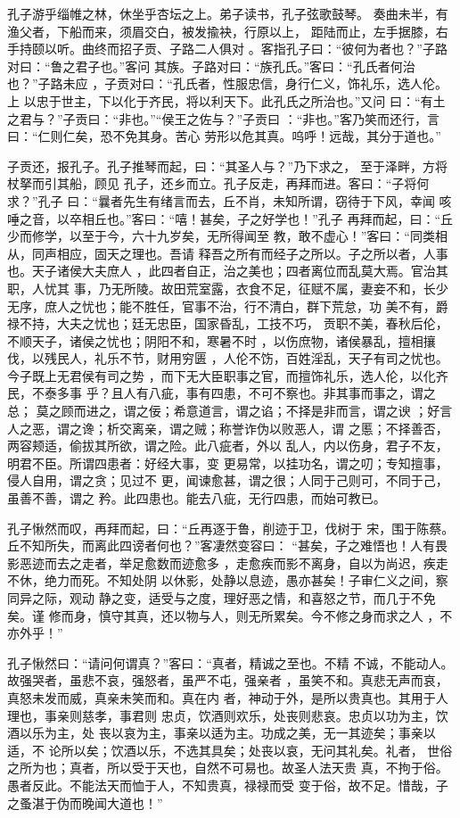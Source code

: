 \documentclass[12pt,UTF8]{ctexbook}
\begin{document}
孔子游乎缁帷之林，休坐乎杏坛之上。弟子读书，孔子弦歌鼓琴。 奏曲未半，有渔父者，下船而来，须眉交白，被发揄袂，行原以上， 距陆而止，左手据膝，右手持颐以听。曲终而招子贡、子路二人俱对 。客指孔子曰：“彼何为者也？”子路对曰：“鲁之君子也。”客问 其族。子路对曰：“族孔氏。”客曰：“孔氏者何治也？”子路未应 ，子贡对曰：“孔氏者，性服忠信，身行仁义，饰礼乐，选人伦。上 以忠于世主，下以化于齐民，将以利天下。此孔氏之所治也。”又问 曰：“有土之君与？”子贡曰：“非也。”“侯王之佐与？”子贡曰 ：“非也。”客乃笑而还行，言曰：“仁则仁矣，恐不免其身。苦心 劳形以危其真。呜呼！远哉，其分于道也。”

子贡还，报孔子。孔子推琴而起，曰：“其圣人与？”乃下求之， 至于泽畔，方将杖拏而引其船，顾见 孔子，还乡而立。孔子反走，再拜而进。客曰：“子将何求？”孔子 曰：“曩者先生有绪言而去，丘不肖，未知所谓，窃待于下风，幸闻 咳唾之音，以卒相丘也。”客曰：“嘻！甚矣，子之好学也！”孔子 再拜而起，曰：“丘少而修学，以至于今，六十九岁矣，无所得闻至 教，敢不虚心！”客曰：“同类相从，同声相应，固天之理也。吾请 释吾之所有而经子之所以。子之所以者，人事也。天子诸侯大夫庶人 ，此四者自正，治之美也；四者离位而乱莫大焉。官治其职，人忧其 事，乃无所陵。故田荒室露，衣食不足，征赋不属，妻妾不和，长少 无序，庶人之忧也；能不胜任，官事不治，行不清白，群下荒怠，功 美不有，爵禄不持，大夫之忧也；廷无忠臣，国家昏乱，工技不巧， 贡职不美，春秋后伦，不顺天子，诸侯之忧也；阴阳不和，寒暑不时 ，以伤庶物，诸侯暴乱，擅相攘伐，以残民人，礼乐不节，财用穷匮 ，人伦不饬，百姓淫乱，天子有司之忧也。今子既上无君侯有司之势 ，而下无大臣职事之官，而擅饰礼乐，选人伦，以化齐民，不泰多事 乎？且人有八疵，事有四患，不可不察也。非其事而事之，谓之总； 莫之顾而进之，谓之佞；希意道言，谓之谄；不择是非而言，谓之谀 ；好言人之恶，谓之谗；析交离亲，谓之贼；称誉诈伪以败恶人，谓 之慝；不择善否，两容颊适，偷拔其所欲，谓之险。此八疵者，外以 乱人，内以伤身，君子不友，明君不臣。所谓四患者：好经大事，变 更易常，以挂功名，谓之叨；专知擅事，侵人自用，谓之贪；见过不 更，闻谏愈甚，谓之很；人同于己则可，不同于己，虽善不善，谓之 矜。此四患也。能去八疵，无行四患，而始可教已。

孔子愀然而叹，再拜而起，曰：“丘再逐于鲁，削迹于卫，伐树于 宋，围于陈蔡。丘不知所失，而离此四谤者何也？”客凄然变容曰： “甚矣，子之难悟也！人有畏影恶迹而去之走者，举足愈数而迹愈多 ，走愈疾而影不离身，自以为尚迟，疾走不休，绝力而死。不知处阴 以休影，处静以息迹，愚亦甚矣！子审仁义之间，察同异之际，观动 静之变，适受与之度，理好恶之情，和喜怒之节，而几于不免矣。谨 修而身，慎守其真，还以物与人，则无所累矣。今不修之身而求之人 ，不亦外乎！”

孔子愀然曰：“请问何谓真？”客曰：“真者，精诚之至也。不精 不诚，不能动人。故强哭者，虽悲不哀，强怒者，虽严不屯，强亲者 ，虽笑不和。真悲无声而哀，真怒未发而威，真亲未笑而和。真在内 者，神动于外，是所以贵真也。其用于人理也，事亲则慈孝，事君则 忠贞，饮酒则欢乐，处丧则悲哀。忠贞以功为主，饮酒以乐为主，处 丧以哀为主，事亲以适为主。功成之美，无一其迹矣；事亲以适，不 论所以矣；饮酒以乐，不选其具矣；处丧以哀，无问其礼矣。礼者， 世俗之所为也；真者，所以受于天也，自然不可易也。故圣人法天贵 真，不拘于俗。愚者反此。不能法天而恤于人，不知贵真，禄禄而受 变于俗，故不足。惜哉，子之蚤湛于伪而晚闻大道也！”
\end{document}
